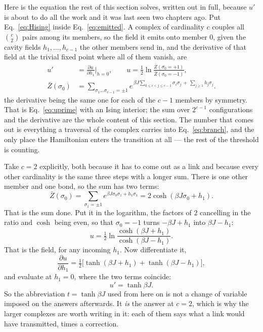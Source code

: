 Here is the equation the rest of this section solves, written out in full,
because $u'$ is about to do all the work and it was last seen two chapters ago.
Put Eq.~\eqref{eq:Hising} inside Eq.~\eqref{eq:emitted}. A complex of
cardinality $c$ couples all $\binom{c}{2}$ pairs among its members, so the field
it emits onto member $0$, given the cavity fields $h_{1},\dots,h_{c-1}$ the
other members send in, and the derivative of that field at the trivial fixed
point where all of them vanish, are
\begin{equation}
  \begin{aligned}
    u'&=\frac{\partial u}{\partial h_{1}}\bigg|_{h=0},
      \qquad
      u=\tfrac12\ln\frac{\bar{Z}(\sigma_{0}=+1)}{\bar{Z}(\sigma_{0}=-1)},\\[4pt]
    \bar{Z}(\sigma_{0})&=\!\!\!\sum_{\sigma_{1}\dots\sigma_{c-1}=\pm1}\!\!\!
      e^{\,\beta J\sum_{0\le i<j\le c-1}\sigma_{i}\sigma_{j}
         \,+\,\sum_{j\ge1}h_{j}\sigma_{j}}.
  \end{aligned}
  \label{eq:uising}
\end{equation}
the derivative being the same one for each of the $c-1$ members by symmetry.
That is Eq.~\eqref{eq:uprime} with an Ising interior; the sum over
$2^{c-1}$ configurations and the derivative are the whole content of this
section. The number that comes out is everything a traversal of the complex
carries into Eq.~\eqref{eq:branch}, and the only place the Hamiltonian enters
the transition at all --- the rest of the threshold is counting.

Take $c=2$ explicitly, both because it has to come out as a link and because
every other cardinality is the same three steps with a longer sum. There is one
other member and one bond, so the sum has two terms:
\[
  \bar{Z}(\sigma_{0})=\sum_{\sigma_{1}=\pm1}
    e^{\beta J\sigma_{0}\sigma_{1}+h_{1}\sigma_{1}}
  =2\cosh(\beta J\sigma_{0}+h_{1}).
\]
That is the sum done. Put it in the logarithm, the factors of $2$ cancelling in
the ratio and $\cosh$ being even, so that $\sigma_{0}=-1$ turns
$-\beta J+h_{1}$ into $\beta J-h_{1}$:
\[
  u=\tfrac12\ln\frac{\cosh(\beta J+h_{1})}{\cosh(\beta J-h_{1})}.
\]
That is the field, for any incoming $h_{1}$. Now differentiate it,
\[
  \frac{\partial u}{\partial h_{1}}
    =\tfrac12\bigl[\tanh(\beta J+h_{1})+\tanh(\beta J-h_{1})\bigr],
\]
and evaluate at $h_{1}=0$, where the two terms coincide:
\[
  u'=\tanh\beta J.
\]
So the abbreviation $t=\tanh\beta J$ used from here on is not a change of
variable imposed on the answers afterwards. It \emph{is} the answer at $c=2$,
which is why the larger complexes are worth writing in it: each of them says
what a link would have transmitted, times a correction.

